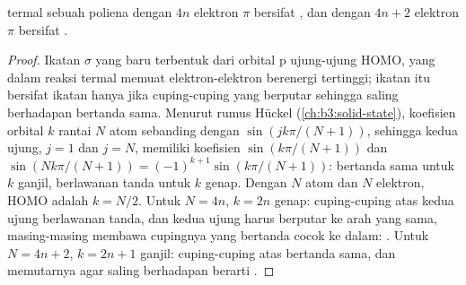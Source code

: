 \begin{theorem}\label{thm:b3:pericyclic:electrocyclic}
 termal sebuah poliena dengan $4n$ elektron $\pi$ bersifat
, dan dengan $4n + 2$ elektron $\pi$ bersifat .
\end{theorem}

\begin{proof}
Ikatan $\sigma$ yang baru terbentuk dari orbital p ujung-ujung HOMO, yang dalam
reaksi termal memuat elektron-elektron berenergi tertinggi; ikatan itu bersifat ikatan hanya jika
cuping-cuping yang berputar sehingga saling berhadapan bertanda sama. Menurut rumus Hückel
(\cref{ch:b3:solid-state}), koefisien orbital $k$ rantai $N$ atom
sebanding dengan $\sin(jk\pi/(N + 1))$, sehingga kedua ujung, $j = 1$ dan $j = N$, memiliki
koefisien $\sin(k\pi/(N + 1))$ dan $\sin(Nk\pi/(N + 1)) = (-1)^{k+1}\sin(k\pi/(N + 1))$: bertanda sama untuk $k$ ganjil,
berlawanan tanda untuk $k$ genap. Dengan $N$ atom dan $N$ elektron, HOMO adalah
$k = N/2$. Untuk $N = 4n$, $k = 2n$ genap: cuping-cuping atas kedua ujung berlawanan
tanda, dan kedua ujung harus berputar ke arah yang sama, masing-masing membawa cupingnya yang
bertanda cocok ke dalam: . Untuk $N = 4n + 2$, $k = 2n + 1$ ganjil: cuping-cuping atas
bertanda sama, dan memutarnya agar saling berhadapan berarti .
\end{proof}


